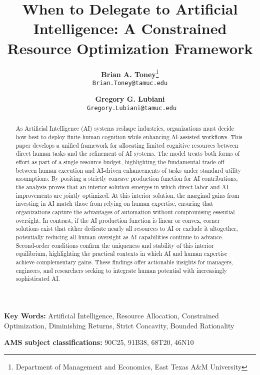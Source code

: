 \documentclass[11pt]{article}
\title{\textbf{When to Delegate to Artificial Intelligence: A Constrained Resource Optimization Framework}}
\author{
\textbf{Brian A. Toney}\thanks{Department of Management and Economics, East Texas A\&M University} \\
\texttt{Brian.Toney@tamuc.edu}
\and
\textbf{Gregory G. Lubiani}\footnotemark[1] \\
\texttt{ Gregory.Lubiani@tamuc.edu}
}
\date{}
\theoremstyle{definition}
\theoremstyle{remark}
\begin{document}
\maketitle

\begin{abstract}
As Artificial Intelligence (AI) systems reshape industries, organizations must decide how best to deploy finite human cognition while enhancing AI-assisted workflows. This paper develops a unified framework for allocating limited cognitive resources between direct human tasks and the refinement of AI systems. The model treats both forms of effort as part of a single resource budget, highlighting the fundamental trade-off between human execution and AI-driven enhancements of tasks under standard utility assumptions. By positing a strictly concave production function for AI contributions, the analysis proves that an interior solution emerges in which direct labor and AI improvements are jointly optimized. At this interior solution, the marginal gains from investing in AI match those from relying on human expertise, ensuring that organizations capture the advantages of automation without compromising essential oversight. In contrast, if the AI production function is linear or convex, corner solutions exist that either dedicate nearly all resources to AI or exclude it altogether, potentially reducing all human oversight as AI capabilities continue to advance. Second-order conditions confirm the uniqueness and stability of this interior equilibrium, highlighting the practical contexts in which AI and human expertise achieve complementary gains. These findings offer actionable insights for managers, engineers, and researchers seeking to integrate human potential with increasingly sophisticated AI.
\end{abstract}
\noindent \textbf{Key Words:} Artificial Intelligence, Resource Allocation, Constrained Optimization, Diminishing Returns, Strict Concavity, Bounded Rationality

\noindent \textbf{AMS subject classifications:} 90C25, 91B38, 68T20, 46N10
\newpage
\end{document}
